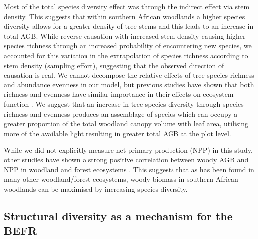 \documentclass[11pt,a4paper]{article}
\begin{document}
Most of the total species diversity effect was through the indirect effect via stem density. This suggests that within southern African woodlands a higher species diversity allows for a greater density of tree stems and this leads to an increase in total AGB. While reverse causation with increased stem density causing higher species richness through an increased probability of encountering new species, we accounted for this variation in the extrapolation of species richness according to stem density (sampling effort), suggesting that the observed direction of causation is real. We cannot decompose the relative effects of tree species richness and abundance evenness in our model, but previous studies have shown that both richness and evenness have similar importance in their effects on ecosystem function \citep{Valery2009, Zhang2012}. We suggest that an increase in tree species diversity through species richness and evenness produces an assemblage of species which can occupy a greater proportion of the total woodland canopy volume with leaf area, utilising more of the available light resulting in greater total AGB at the plot level. 


While we did not explicitly measure net primary production (NPP) in this study, other studies have shown a strong positive correlation between woody AGB and NPP in woodland and forest ecosystems \citep{}. This suggests that as has been found in many other woodland/forest ecosystems, woody biomass in southern African woodlands can be maximised by increasing species diversity. 

\subsection{Structural diversity as a mechanism for the BEFR}
\end{document}
